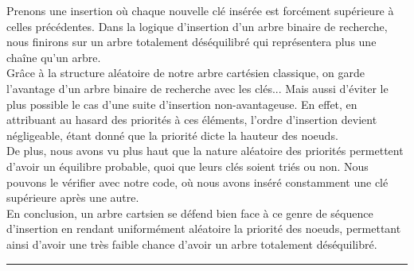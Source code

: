 \documentclass[a4paper,12pt]{report}
\begin{document}
\newpage


\begin{tcolorbox}[colback=gray!10, colframe=blue!30, coltitle=black, title=La défense de l'arbre cartésien aléatoire face à l'arbre binaire de recherche - 1/1]

    Prenons une insertion où chaque nouvelle clé insérée est forcément supérieure à celles précédentes. Dans la logique d'insertion d'un arbre binaire de recherche,
        nous finirons sur un arbre totalement déséquilibré qui représentera plus une chaîne qu'un arbre.\\

    Grâce à la structure aléatoire de notre arbre cartésien classique, on garde l'avantage d'un arbre binaire de recherche avec les clés... Mais aussi d'éviter le plus
        possible le cas d'une suite d'insertion non-avantageuse. En effet, en attribuant au hasard des priorités à ces éléments, l'ordre d'insertion devient négligeable,
        étant donné que la priorité dicte la hauteur des noeuds. \\
        
    De plus, nous avons vu plus haut que la nature aléatoire des priorités permettent d'avoir un équilibre
        probable, quoi que leurs clés soient triés ou non. Nous pouvons le vérifier avec notre code, où nous avons inséré constamment une clé supérieure après une autre.\\

    En conclusion, un arbre cartsien se défend bien face à ce genre de séquence d'insertion en rendant uniformément aléatoire la priorité des noeuds, permettant ainsi
        d'avoir une très faible chance d'avoir un arbre totalement déséquilibré.

\end{tcolorbox}

\vspace{0.5cm}
\hrule
\vspace{0.5cm}

\end{document}
